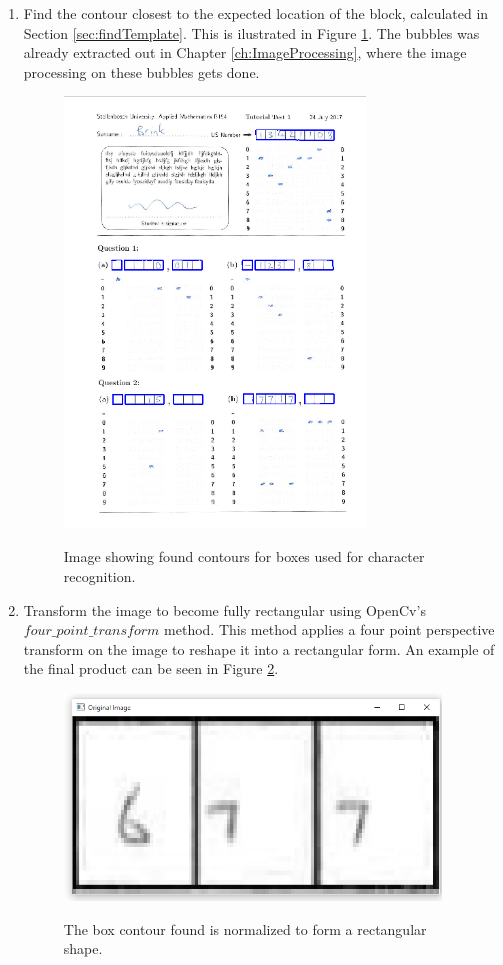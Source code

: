 \begin{enumerate}
\item Find the contour closest to the expected location of the block, calculated in Section \ref{sec:findTemplate}. This is ilustrated in Figure \ref{fig:sa}. The bubbles was already extracted out in Chapter \ref{ch:ImageProcessing}, where the image processing on these bubbles gets done.

\begin{figure}
  \centering
  \includegraphics[width=8cm]{DigitScan}\\
  \caption{Image showing found contours for boxes used for character recognition.}
  \label{fig:sa}
\end{figure}

\item Transform the image to become fully rectangular using OpenCv's $four\_point\_transform$ method. This method applies a four point perspective transform on the image to reshape it into a rectangular form. An example of the final product can be seen in Figure \ref{fig:bp}.

\begin{figure}
  \centering
  \includegraphics[width=10cm]{BeforeProcessing}\\
  \caption{The box contour found is normalized to form a rectangular shape.}
  \label{fig:bp}
\end{figure}


\end{enumerate}
